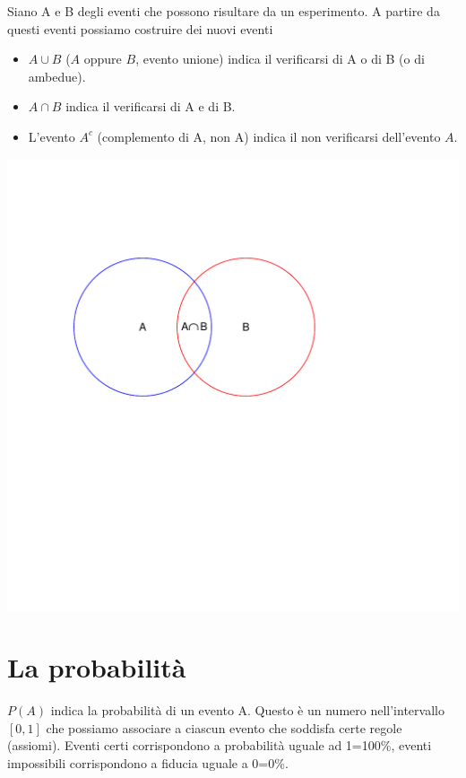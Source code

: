 \documentclass[onecolumn,12pt]{book}\usepackage[]{graphicx}\usepackage[]{color}
\makeatletter
\def\maxwidth{ %
  \ifdim\Gin@nat@width>\linewidth
    \linewidth
  \else
    \Gin@nat@width
  \fi
}
\newenvironment{knitrout}{}{} %
\makeatother
\begin{document}
Siano A e  B degli eventi che possono risultare da un esperimento. A partire da questi eventi possiamo costruire dei nuovi eventi
\begin{itemize}
\item $A\cup B$ ($A$ oppure $B$, evento unione) indica il verificarsi di A o di B (o di ambedue).
\item $A \cap  B$  indica il verificarsi di A e di  B.
\item L'evento  $A^c$ (complemento di A, non A)   indica il non verificarsi dell'evento $A$.   
\end{itemize}
\begin{knitrout}
\color{fgcolor}
\includegraphics[width=\maxwidth]{figure/unnamed-chunk-3-1} 

\end{knitrout}


\section{La probabilità}

$P(A)$ indica la probabilità di un evento A. Questo è un numero nell'intervallo $[0,1]$ che possiamo associare a ciascun evento che soddisfa certe regole (assiomi).
Eventi certi corrispondono a probabilità uguale ad 1=100\%, eventi impossibili corrispondono a fiducia uguale a 0=0\%.
\end{document}
